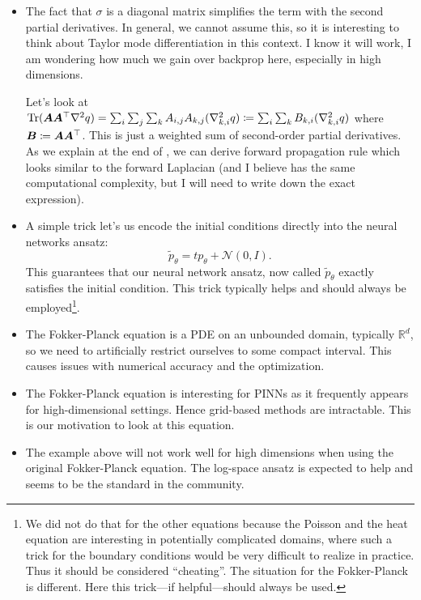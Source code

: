 \begin{itemize}
    \item The fact that $\sigma$ is a diagonal matrix simplifies the term with the second partial derivatives. In general, we cannot assume this, so it is interesting to think about Taylor mode differentiation in this context. I know it will work, I am wondering how much we gain over backprop here, especially in high dimensions. 

    Let's look at $\operatorname{Tr}({\bm{A}} {\bm{A}}^\top \nabla^2 q) = \sum_i \sum_j \sum_k {A}_{i,j} {A}_{k,j} (\nabla^2_{k,i} q) \coloneqq \sum_i \sum_k {B}_{k,i} (\nabla^2_{k,i} q)$ where ${\bm{B}} \coloneqq {\bm{A}} {\bm{A}}^\top$. This is just a weighted sum of second-order partial derivatives. As we explain at the end of , we can derive forward propagation rule which looks similar to the forward Laplacian (and I believe has the same computational complexity, but I will need to write down the exact expression).

    
    \item A simple trick let's us encode the initial conditions directly into the neural networks ansatz:
    \begin{equation}
        \tilde p_\theta = t p_\theta + \mathcal N(0, I).
    \end{equation}
    This guarantees that our neural network ansatz, now called $\tilde p_\theta$ exactly satisfies the initial condition. This trick typically helps and should always be employed\footnote{We did not do that for the other equations because the Poisson and the heat equation are interesting in potentially complicated domains, where such a trick for the boundary conditions would be very difficult to realize in practice. Thus it should be considered ``cheating''. The situation for the Fokker-Planck is different. Here this trick---if helpful---should always be used.}. 
    \item The Fokker-Planck equation is a PDE on an unbounded domain, typically $\mathbb R^d$, so we need to artificially restrict ourselves to some compact interval. This causes issues with numerical accuracy and the optimization.
    \item The Fokker-Planck equation is interesting for PINNs as it frequently appears for high-dimensional settings. Hence grid-based methods are intractable. This is our motivation to look at this equation.
    \item The example above will not work well for high dimensions when using the original Fokker-Planck equation. The log-space ansatz is expected to help and seems to be the standard in the community.
\end{itemize}

